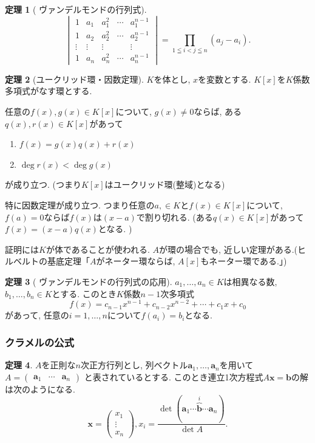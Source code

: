 \documentclass[dvipdfmx,a4paper,11pt]{article} %
\newcommand{\Q}{\mathbb{Q}}
\theoremstyle{definition}
\newtheorem{thm}{定理}
\begin{document}
 \begin{thm}[{\cite[定理 3.5.2]{O} ヴァンデルモンドの行列式}]
    $$
\begin{vmatrix}
1 & a_1 & a_1^2 & \cdots & a_1^{n-1} \\
1 & a_2 & a_2^2 & \cdots & a_2^{n-1} \\
\vdots & \vdots & \vdots & & \vdots \\
1 & a_n & a_n^2 & \cdots & a_n^{n-1}
\end{vmatrix}
=
\prod_{1 \leqq i < j \leqq n} (a_j-a_i).
$$
\end{thm}

\begin{thm}[ユークリッド環・因数定理]
$K$を体とし, $x$を変数とする. 
$K[x]$を$K$係数多項式がなす環とする.

任意の$f(x), g(x) \in K[x]$について, $g(x) \neq 0$ならば, ある$q(x), r(x) \in K[x]$があって
\begin{enumerate}
\item $f(x) = g(x) q(x) + r(x)$
\item $\deg r (x) < \deg g(x)$
\end{enumerate}
 が成り立つ. (つまり$K[x]$はユークリッド環(整域)となる)
 
 特に因数定理が成り立つ. つまり任意の$a, \in K$と$f(x) \in K[x]$について, $f(a)=0$ならば$f(x)$は$(x-a)$で割り切れる. 
 (ある$q(x) \in K[x]$があって$f(x)=(x-a)q(x)$となる. )
\end{thm}
証明には$K$が体であることが使われる. $A$が環の場合でも, 近しい定理がある.(ヒルベルトの基底定理「$A$がネーター環ならば, $A[x]$もネーター環である.」)

  \begin{thm}[{\cite[例 3.5.3]{O} ヴァンデルモンドの行列式の応用}]
$a_1, \ldots, a_n \in K$は相異なる数, 
$b_1, \ldots, b_n \in K$とする. 
 このとき$K$係数$n-1$次多項式
 $$
 f(x) = c_{n-1}x^{n-1} +  c_{n-2} x^{n-2} +  \cdots +  c_{1} x + c_{0}
 $$
 があって, 任意の$i = 1, \ldots, n$について$f(a_i) =b_i$となる.
\end{thm}

\subsubsection{クラメルの公式}

  \begin{thm}\cite[定理 3.5.4]{O}
$A$を正則な$n$次正方行列とし, 列ベクトル$\bm{a}_1, \ldots, \bm{a}_{n}$を用いて
$
A = 
\begin{pmatrix}
\bm{a}_1 & \cdots & \bm{a}_{n}
\end{pmatrix}
$
と表されているとする.
このとき連立1次方程式$A \bm{x} =\bm{b}$の解は次のようになる.
$$
\bm{x}= \begin{pmatrix}
x_1 \\ \vdots \\ x_{n}
\end{pmatrix}, 
x_i = \frac{\det
(\bm{a}_1 \cdots \overbrace{\bm{b}}^{i} \cdots   \bm{a}_{n}
)
}{\det A}.
$$
    \end{thm}
\end{document}
